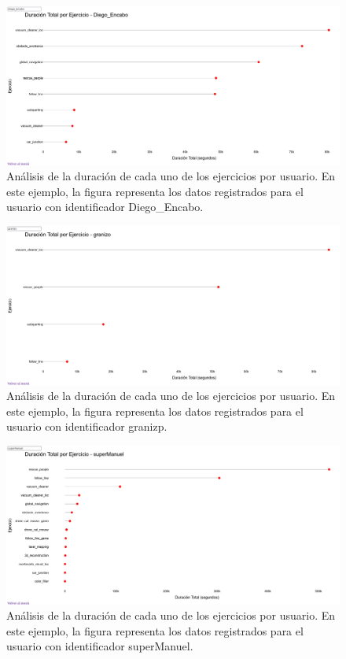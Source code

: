 \documentclass[a4paper, 12pt]{book}
\begin{document}
\begin{figure}[H]
  \centering
  \includegraphics[width=1.1\textwidth]{img/1aa.png}
  \caption{Análisis de la duración de cada uno de los ejercicios por usuario. En este ejemplo, la figura representa los datos registrados para el usuario con identificador Diego\_Encabo.}
  \label{fig:1aa}
\end{figure}

\begin{figure}[H]
  \centering
  \includegraphics[width=1.1\textwidth]{img/1aaa.png}
  \caption{Análisis de la duración de cada uno de los ejercicios por usuario. En este ejemplo, la figura representa los datos registrados para el usuario con identificador granizp.}
  \label{fig:1aaa}
\end{figure}

\begin{figure}[H]
  \centering
  \includegraphics[width=1.1\textwidth]{img/1aaaa.png}
  \caption{Análisis de la duración de cada uno de los ejercicios por usuario. En este ejemplo, la figura representa los datos registrados para el usuario con identificador superManuel.}
  \label{fig:1aaaa}
\end{figure}
\end{document}
